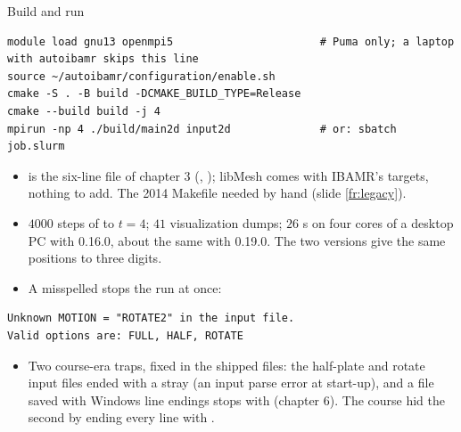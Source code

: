 \documentclass[aspectratio=169,11pt]{beamer}
\begin{document}
\begin{frame}[fragile]{Build and run}
\label{fr:build}
\footnotesize
\begin{lstlisting}[style=shell]
module load gnu13 openmpi5                       # Puma only; a laptop with autoibamr skips this line
source ~/autoibamr/configuration/enable.sh
cmake -S . -B build -DCMAKE_BUILD_TYPE=Release
cmake --build build -j 4
mpirun -np 4 ./build/main2d input2d              # or: sbatch job.slurm
\end{lstlisting}
\begin{itemize}
  \item {} is the six-line file of chapter 3 (, ); libMesh comes with IBAMR's targets, nothing to add. The 2014 Makefile needed  by hand (slide \ref{fr:legacy}).
  \item $4000$ steps of  to $t = 4$; $41$ visualization dumps; $26$ s on four cores of a desktop PC with 0.16.0, about the same with 0.19.0. The two versions give the same positions to three digits.
  \item A misspelled  stops the run at once:
\end{itemize}
\begin{lstlisting}[style=data]
Unknown MOTION = "ROTATE2" in the input file.
Valid options are: FULL, HALF, ROTATE
\end{lstlisting}
\begin{itemize}
  \item Two course-era traps, fixed in the shipped files: the half-plate and rotate input files ended with a stray \code{\textbackslash\textbackslash} (an input parse error at start-up), and a file saved with Windows line endings stops with  (chapter 6). The course hid the second by ending every line with \code{//}.
\end{itemize}
\end{frame}
\end{document}

